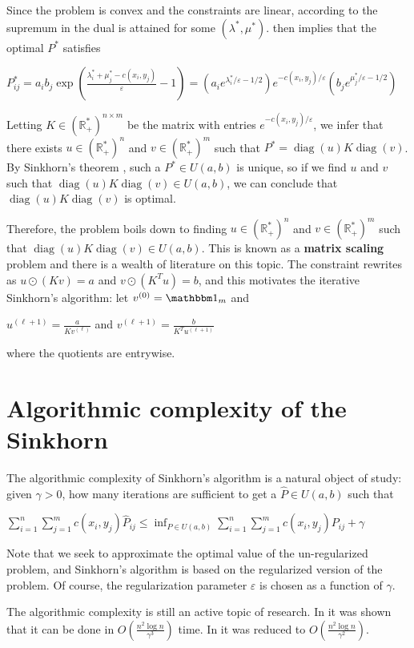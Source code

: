 \documentclass[12pt]{report}
\theoremstyle{definition}
\theoremstyle{remark}
\DeclareMathOperator*{\diag}{diag}
\begin{document}
Since the problem is convex and the constraints are linear, according to \cite[Section~5.2.3]{boyd2004convex} the supremum in the dual is attained for some $(\lambda^*,\mu^*)$. \cite[Section~5.5.2]{boyd2004convex} then implies that the optimal $P^*$ satisfies \begin{center}
	$P_{ij}^* =a_i b_j \exp\left(\frac{\lambda_i^*+\mu_j^*-c(x_i,y_j)}{\varepsilon}-1 \right) = (a_ie^{\lambda_i^*/\varepsilon-1/2})e^{-c(x_i,y_j)/\varepsilon}(b_je^{\mu_j^*/\varepsilon-1/2})$
\end{center} Letting $K\in (\mathbb R_+^*)^{n\times m}$ be the matrix with entries $e^{-c(x_i,y_j)/\varepsilon}$, we infer that there exists $u\in (\mathbb R_+^*)^n$ and $v\in  (\mathbb R_+^*)^m$ such that $P^* = \diag(u)K\diag(v)$. By Sinkhorn's theorem \cite{idel2016review}, such a $P^*\in U(a,b)$ is unique, so if we find $u$ and $v$ such that $\diag(u)K\diag(v)\in U(a,b)$, we can conclude that $\diag(u)K\diag(v)$ is optimal.
\par Therefore, the problem boils down to finding $u\in (\mathbb R_+^*)^n$ and $v\in  (\mathbb R_+^*)^m$ such that $\diag(u)K\diag(v)\in U(a,b)$. This is known as a \textbf{matrix scaling} problem and there is a wealth of literature on this topic. The constraint rewrites as $u \odot (Kv) = a$ and $v \odot (K^Tu) =b$, and this motivates the iterative Sinkhorn's algorithm: let $v^{(0)}=\mathbbm 1_m$ and \begin{center}
	$\displaystyle u^{(\ell+1)} = \frac{a}{K v^{(\ell)}}$ and $\displaystyle v^{(\ell+1)} = \frac{b}{K^T u^{(\ell+1)}}$
\end{center} where the quotients are entrywise.

\section{Algorithmic complexity of the Sinkhorn}

\hspace{\parindent} The algorithmic complexity of Sinkhorn's algorithm is a natural object of study: given $\gamma>0$, how many iterations are sufficient to get a $\hat P\in U(a,b)$ such that \begin{center}
	$\displaystyle \sum_{i=1}^n\sum_{j=1}^m c(x_i,y_j)\hat P_{ij} \leq \inf_{P\in U(a,b)} \sum_{i=1}^n\sum_{j=1}^m c(x_i,y_j)P_{ij} + \gamma$
\end{center}
Note that we seek to approximate the optimal value of the un-regularized problem, and Sinkhorn's algorithm is based on the regularized version of the problem. Of course, the regularization parameter $\varepsilon$ is chosen as a function of $\gamma$.
\par The algorithmic complexity is still an active topic of research. In \cite{altschuler2017near} it was shown that it can be done in $O\left(\frac{n^2\log n}{\gamma^3} \right)$ time. In \cite{dvurechensky2018computational} it was reduced to $O\left(\frac{n^2\log n}{\gamma^2} \right)$.
\end{document}
